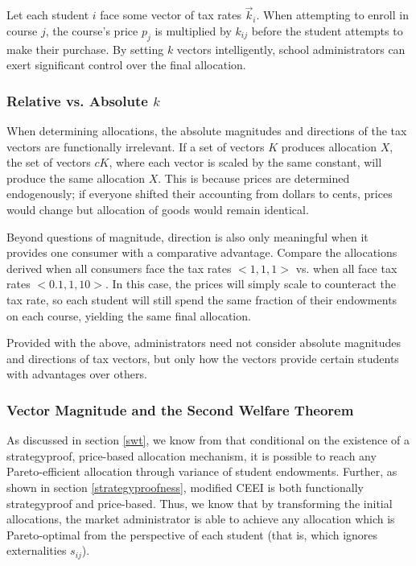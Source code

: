 \documentclass{article}
\begin{document}
Let each student $i$ face some vector of tax rates $\vec{k}_i$. When attempting to enroll in course $j$, the course's price $p_j$ is multiplied by $k_{ij}$ before the student attempts to make their purchase. By setting $k$ vectors intelligently, school administrators can exert significant control over the final allocation.

\subsubsection{Relative vs. Absolute $k$}

When determining allocations, the absolute magnitudes and directions of the tax vectors are functionally irrelevant. If a set of vectors $K$ produces allocation $X$, the set of vectors $cK$, where each vector is scaled by the same constant, will produce the same allocation $X$. This is because prices are determined endogenously; if everyone shifted their accounting from dollars to cents, prices would change but allocation of goods would remain identical.

Beyond questions of magnitude, direction is also only meaningful when it provides one consumer with a comparative advantage. Compare the allocations derived when all consumers face the tax rates $<1, 1, 1>$ vs. when all face tax rates $<0.1, 1, 10>$. In this case, the prices will simply scale to counteract the tax rate, so each student will still spend the same fraction of their endowments on each course, yielding the same final allocation.

Provided with the above, administrators need not consider absolute magnitudes and directions of tax vectors, but only how the vectors provide certain students with advantages over others.

\subsubsection{Vector Magnitude and the Second Welfare Theorem}

As discussed in section \ref{swt}, we know from \textcite{miralles2014} that conditional on the existence of a strategyproof, price-based allocation mechanism, it is possible to reach any Pareto-efficient allocation through variance of student endowments. Further, as shown in section \ref{strategyproofness}, modified CEEI is both functionally strategyproof and price-based. Thus, we know that by transforming the initial allocations, the market administrator is able to achieve any allocation which is Pareto-optimal from the perspective of each student (that is, which ignores externalities $s_{ij}$). 
\end{document}
